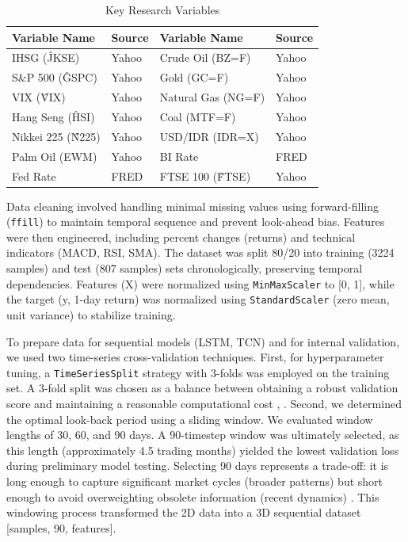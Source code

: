 \documentclass[conference]{IEEEtran}
\begin{document}
\begin{table}[!t]
  \centering
  \caption{Key Research Variables}
  \label{tab:variables}
  \begin{tabular}{@{}ll ll@{}}
    \toprule
    Variable Name       & Source & Variable Name      & Source \\
    \midrule
    IHSG (\^JKSE)       & Yahoo  & Crude Oil (BZ=F)   & Yahoo  \\
    S\&P 500 (\^GSPC)   & Yahoo  & Gold (GC=F)        & Yahoo  \\
    VIX (\^VIX)         & Yahoo  & Natural Gas (NG=F) & Yahoo  \\
    Hang Seng (\^HSI)   & Yahoo  & Coal (MTF=F)       & Yahoo  \\
    Nikkei 225 (\^N225) & Yahoo  & USD/IDR (IDR=X)    & Yahoo  \\
    Palm Oil (EWM)      & Yahoo  & BI Rate            & FRED   \\
    Fed Rate            & FRED   & FTSE 100 (\^FTSE)  & Yahoo  \\
    \bottomrule
  \end{tabular}
\end{table}

Data cleaning involved handling minimal missing values using forward-filling (\texttt{ffill}) to maintain temporal sequence and prevent look-ahead bias. Features were then engineered, including percent changes (returns) and technical indicators (MACD, RSI, SMA). The dataset was split 80/20 into training (3224 samples) and test (807 samples) sets chronologically, preserving temporal dependencies. Features (X) were normalized using \texttt{MinMaxScaler} to [0, 1], while the target (y, 1-day return) was normalized using \texttt{StandardScaler} (zero mean, unit variance) to stabilize training.

\par To prepare data for sequential models (LSTM, TCN) and for internal validation, we used two time-series cross-validation techniques. First, for hyperparameter tuning, a \texttt{TimeSeriesSplit} strategy with 3-folds was employed on the training set. A 3-fold split was chosen as a balance between obtaining a robust validation score and maintaining a reasonable computational cost \cite{b41}, \cite{b42}. Second, we determined the optimal look-back period using a sliding window. We evaluated window lengths of 30, 60, and 90 days. A 90-timestep window was ultimately selected, as this length (approximately 4.5 trading months) yielded the lowest validation loss during preliminary model testing. Selecting 90 days represents a trade-off: it is long enough to capture significant market cycles (broader patterns) but short enough to avoid overweighting obsolete information (recent dynamics) \cite{b43}. This windowing process transformed the 2D data into a 3D sequential dataset [samples, 90, features].
\end{document}
